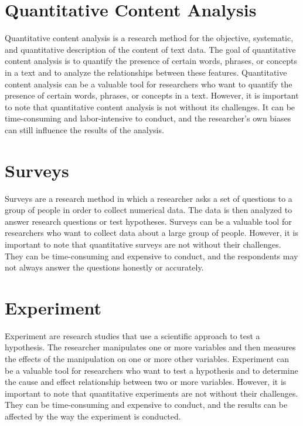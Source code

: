 \documentclass[
  b5paper]{book}
\begin{document}
\hypertarget{quantitative-content-analysis}{%
\section*{Quantitative Content Analysis}\label{quantitative-content-analysis}}

Quantitative content analysis is a research method for the objective, systematic, and quantitative description of the content of text data. The goal of quantitative content analysis is to quantify the presence of certain words, phrases, or concepts in a text and to analyze the relationships between these features. Quantitative content analysis can be a valuable tool for researchers who want to quantify the presence of certain words, phrases, or concepts in a text. However, it is important to note that quantitative content analysis is not without its challenges. It can be time-consuming and labor-intensive to conduct, and the researcher's own biases can still influence the results of the analysis.

\hypertarget{surveys}{%
\section*{Surveys}\label{surveys}}

Surveys are a research method in which a researcher asks a set of questions to a group of people in order to collect numerical data. The data is then analyzed to answer research questions or test hypotheses. Surveys can be a valuable tool for researchers who want to collect data about a large group of people. However, it is important to note that quantitative surveys are not without their challenges. They can be time-consuming and expensive to conduct, and the respondents may not always answer the questions honestly or accurately.

\hypertarget{experiment}{%
\section*{Experiment}\label{experiment}}

Experiment are research studies that use a scientific approach to test a hypothesis. The researcher manipulates one or more variables and then measures the effects of the manipulation on one or more other variables. Experiment can be a valuable tool for researchers who want to test a hypothesis and to determine the cause and effect relationship between two or more variables. However, it is important to note that quantitative experiments are not without their challenges. They can be time-consuming and expensive to conduct, and the results can be affected by the way the experiment is conducted.
\end{document}
